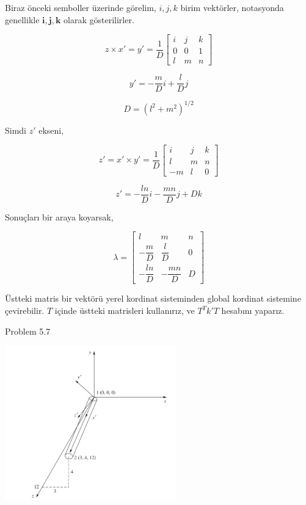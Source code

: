 \documentclass[12pt,fleqn]{article}\usepackage{../../common}
\begin{document}
Biraz önceki semboller üzerinde görelim, $i,j,k$ birim vektörler, notasyonda
genellikle $\mathbf{i},\mathbf{j},\mathbf{k}$ olarak gösterilirler.

$$
z \times x' = y' = \frac{1}{D}
\left[\begin{array}{ccc}
i & j & k \\ 0 & 0 & 1 \\ l & m & n
\end{array}\right]
$$

$$
y' = - \frac{m}{D} i + \frac{l}{D} j
$$

$$
D = (l^2 + m^2)^{1/2}
$$

Simdi $z'$ ekseni,

$$
z' = x' \times y' = \frac{1}{D}
\left[\begin{array}{ccc}
i & j & k \\ l & m & n \\ -m & l & 0
\end{array}\right]
$$

$$
z' = -\frac{ln}{D} i - \frac{mn}{D} j + D k 
$$

Sonuçları bir araya koyarsak,

$$
\renewcommand*{\arraystretch}{2.0}
\lambda = \left[\begin{array}{ccc}
l & m & n \\
-\dfrac{m}{D} & \dfrac{l}{D} & 0 \\
-\dfrac{ln}{D} & -\dfrac{mn}{D} & D
\end{array}\right]
$$

Üstteki matris bir vektörü yerel kordinat sisteminden global kordinat sistemine
çevirebilir. $T$ içinde üstteki matrisleri kullanırız, ve $T^T k' T$ hesabını
yaparız.

Problem 5.7


\includegraphics[width=20em]{phy_020_strs_11_05.jpg}
\end{document}
